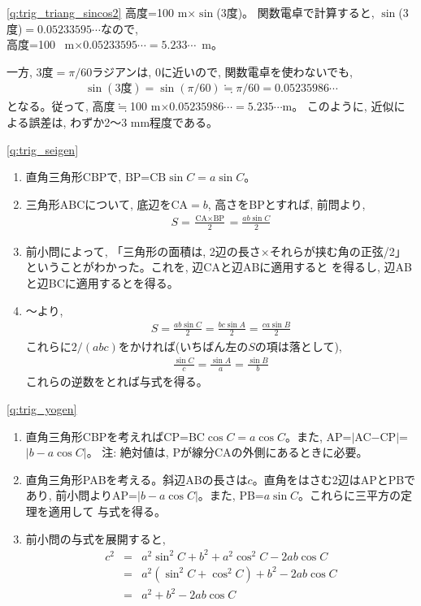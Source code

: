\ref{q:trig_triang_sincos2} 高度=100$\,\,$m$\times \sin$(3度)。
関数電卓で計算すると, $\sin$(3度)$=0.05233595\cdots$なので,\\
高度=100$\,\,$~m$\times 0.05233595\cdots=5.233\cdots$~m。

一方, 3度$=\pi/60$ラジアンは, 0に近いので, 関数電卓を使わないでも, 
\begin{eqnarray*}
\sin(3\text{度})=\sin(\pi/60)\fallingdotseq\pi/60=0.05235986\cdots
\end{eqnarray*}
となる。従って, 高度$\fallingdotseq$100$\,\,$m$\times 0.05235986\cdots=5.235\cdots$m。
このように, 近似による誤差は, わずか2〜3$\,\,$mm程度である。
\vspace{0.3cm}

\ref{q:trig_seigen} 
\begin{enumerate}
\item 直角三角形CBPで, $\text{BP=CB}\sin C=a\sin C$。
\item 三角形ABCについて, 底辺をCA$=b$, 高さをBPとすれば, 前問より, 
\begin{eqnarray*}
S=\frac{\text{CA}\times \text{BP}}{2}=\frac{ab\sin C}{2}
\end{eqnarray*}
\item 前小問によって, 「三角形の面積は, 2辺の長さ×それらが挟む角の正弦/2」
ということがわかった。これを, 辺CAと辺ABに適用すると
を得るし, 辺ABと辺BCに適用するとを得る。
\item {}〜より, 
\begin{eqnarray*}
S=\frac{ab\sin C}{2}=\frac{bc\sin A}{2}=\frac{ca\sin B}{2}
\end{eqnarray*}
これらに$2/(abc)$をかければ(いちばん左の$S$の項は落として), 
\begin{eqnarray*}
\frac{\sin C}{c}=\frac{\sin A}{a}=\frac{\sin B}{b}
\end{eqnarray*}
これらの逆数をとれば与式を得る。
\end{enumerate}


\ref{q:trig_yogen} 
\begin{enumerate}
\item 直角三角形CBPを考えればCP=BC$\cos C=a\cos C$。また, 
AP=$|$AC$-$CP$|$=$|b-a\cos C|$。
注: 絶対値は, Pが線分CAの外側にあるときに必要。
\item 直角三角形PABを考える。斜辺ABの長さは$c$。直角をはさむ2辺はAPとPBであり, 
前小問よりAP=$|b-a\cos C|$。また, PB=$a\sin C$。これらに三平方の定理を適用して
与式を得る。
\item 前小問の与式を展開すると,
\begin{eqnarray*}
c^2&=&a^2\sin^2 C+b^2+a^2\cos^2C-2ab\cos C\\
   &=&a^2(\sin^2 C+\cos^2C)+b^2-2ab\cos C\\
   &=&a^2+b^2-2ab\cos C\\
\end{eqnarray*}
\end{enumerate}
\mv

